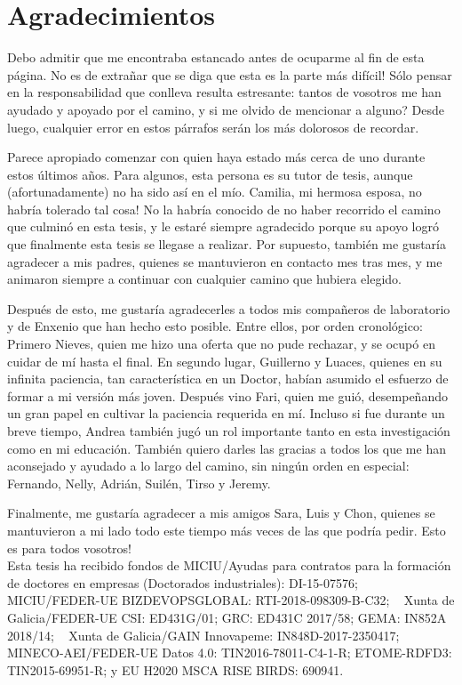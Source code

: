 \chapter*{Agradecimientos}
Debo admitir que me encontraba estancado antes de ocuparme al fin de esta p\'agina. \textexclamdown No es de extra\~nar que se diga que esta es la parte m\'as dif\'icil! S\'olo pensar en la responsabilidad que conlleva resulta estresante: tantos de vosotros me han ayudado y apoyado por el camino, \textquestiondown y si me olvido de mencionar a alguno? Desde luego, cualquier error en estos p\'arrafos ser\'an los m\'as dolorosos de recordar.

Parece apropiado comenzar con quien haya estado m\'as cerca de uno durante estos \'ultimos a\~nos. Para algunos, esta persona es su tutor de tesis, aunque (afortunadamente) no ha sido as\'i en el m\'io. \textexclamdown Camilia, mi hermosa esposa, no habr\'ia tolerado tal cosa! No la habr\'ia conocido de no haber recorrido el camino que culmin\'o en esta tesis, y le estar\'e siempre agradecido porque su apoyo logr\'o que finalmente esta tesis se llegase a realizar. Por supuesto, tambi\'en me gustar\'ia agradecer a mis padres, quienes se mantuvieron en contacto mes tras mes, y me animaron siempre a continuar con cualquier camino que hubiera elegido.

Despu\'es de esto, me gustar\'ia agradecerles a todos mis compa\~neros de laboratorio y de Enxenio que han hecho esto posible. Entre ellos, por orden cronol\'ogico: Primero Nieves, quien me hizo una oferta que no pude rechazar, y se ocup\'o en cuidar de m\'i hasta el final. En segundo lugar, Guillerno y Luaces, quienes en su infinita paciencia, tan caracter\'istica en un Doctor, hab\'ian asumido el esfuerzo de formar a mi versi\'on m\'as joven. Despu\'es vino Fari, quien me gui\'o, desempe\~nando un gran papel en cultivar la paciencia requerida en m\'i. Incluso si fue durante un breve tiempo, Andrea tambi\'en jug\'o un rol importante tanto en esta investigaci\'on como en mi educaci\'on. Tambi\'en quiero darles las gracias a todos  los que me han aconsejado y ayudado a lo largo del camino, sin ning\'un orden en especial: Fernando, Nelly, Adri\'an, Suil\'en, Tirso y Jeremy.

Finalmente, me gustar\'ia agradecer a mis amigos Sara, Luis y Chon, quienes se mantuvieron a mi lado todo este tiempo m\'as veces de las que podr\'ia pedir. \textexclamdown Esto es para todos vosotros!\\

\small{Esta tesis ha recibido fondos de MICIU/Ayudas para contratos para la formaci\'on de doctores en empresas (Doctorados industriales): DI-15-07576; ~ MICIU/FEDER-UE BIZDEVOPSGLOBAL: RTI-2018-098309-B-C32; ~  Xunta de Galicia/FEDER-UE CSI: ED431G/01; GRC: ED431C 2017/58; GEMA: IN852A 2018/14; ~ Xunta de Galicia/GAIN Innovapeme: IN848D-2017-2350417; ~ MINECO-AEI/FEDER-UE Datos 4.0: TIN2016-78011-C4-1-R; ETOME-RDFD3: TIN2015-69951-R; y EU H2020 MSCA RISE BIRDS: 690941.}
